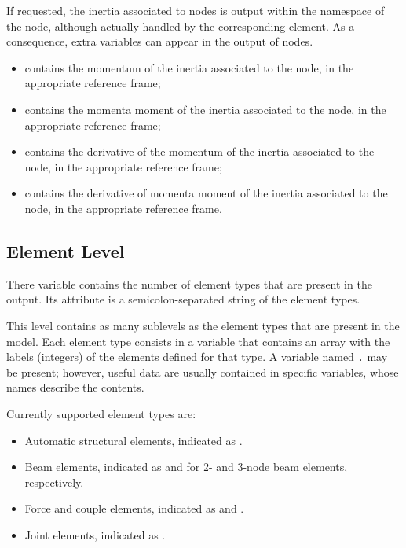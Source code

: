 If requested, the inertia associated to  nodes is output
within the namespace of the node, although actually handled
by the corresponding  element.
As a consequence, extra variables can appear in the output
of  nodes.
\begin{itemize}
\item {} contains the momentum of the inertia
associated to the node, in the appropriate reference frame;

\item {} contains the momenta moment of the inertia
associated to the node, in the appropriate reference frame;

\item {} contains the derivative of the momentum
of the inertia associated to the node, in the appropriate reference frame;

\item {} contains the derivative of momenta moment
of the inertia associated to the node, in the appropriate reference frame.
\end{itemize}


\subsection{Element Level}
There variable  contains the number of element types that are present in the output.
Its attribute  is a semicolon-separated string of the element types.

This level contains as many sublevels as the element types
that are present in the model.
Each element type consists in a variable that contains an array
with the labels (integers) of the elements defined for that type.
A variable named \texttt{.} may be present; however,
useful data are usually contained in specific variables,
whose names describe the contents.

Currently supported element types are:
\begin{itemize}
\item Automatic structural elements, indicated as .
\item Beam elements, indicated as  and 
for 2- and 3-node beam elements, respectively.
\item Force and couple elements, indicated as  and .
\item Joint elements, indicated as .
\end{itemize}


